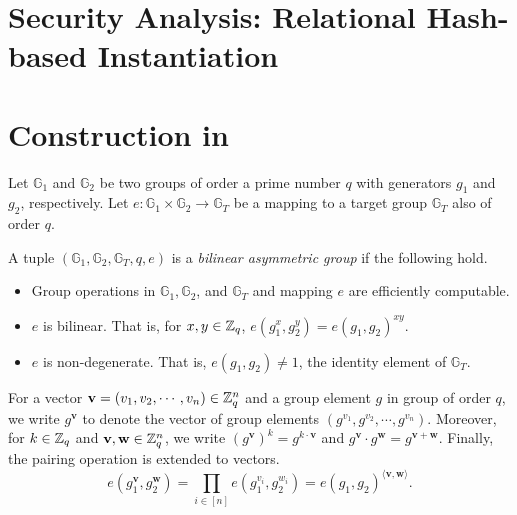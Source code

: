 \section{Security Analysis: Relational Hash-based Instantiation}
\label{sec:security_analysis:rh}



\newpage
\appendix


\section{Construction in \cite{cryptoeprint:2016/440}}
\label{sec:fh-IPFE-construction}

Let $\mathbb{G}_1$ and $\mathbb{G}_2$ be two groups of order a prime number $q$ with generators $g_1$ and $g_2$, respectively. Let $e: \mathbb{G}_1 \times \mathbb{G}_2 \to \mathbb{G}_T$ be a mapping to a target group $\mathbb{G}_T$ also of order $q$. 

\begin{definition}
\label{bilinear-group}

A tuple $(\mathbb{G}_1, \mathbb{G}_2, \mathbb{G}_T, q, e)$ is a \emph{bilinear asymmetric group} if the following hold.

\begin{itemize}

	\item Group operations in $\mathbb{G}_1, \mathbb{G}_2$, and $\mathbb{G}_T$ and mapping $e$ are efficiently computable.

	\item $e$ is bilinear. That is, for $x, y \in \mathbb{Z}_q$, $e(g_1^x, g_2^y) = e(g_1, g_2)^{xy}$.

	\item $e$ is non-degenerate. That is, $e(g_1, g_2) \neq 1$, the identity element of $\mathbb{G}_T$.

\end{itemize}

\end{definition}

For a vector $\mathbf{v} = (v_1, v_2, \cdots, v_n) \in \mathbb{Z}_q^n$ and a group element $g$ in group of order $q$, we write $g^\mathbf{v}$ to denote the vector of group elements $(g^{v_1}, g^{v_2}, \cdots, g^{v_n})$. Moreover, for $k \in \mathbb{Z}_q$ and $\mathbf{v}, \mathbf{w} \in \mathbb{Z}_q^n$, we write $(g^{\mathbf{v}})^k = g^{k \cdot \mathbf{v}}$ and $g^\mathbf{v} \cdot g^\mathbf{w} =  g^{\mathbf{v} + \mathbf{w}}$. Finally, the pairing operation is extended to vectors.
\[
	e(g_1^{\mathbf{v}}, g_2^{\mathbf{w}}) = \prod_{i \in [n]} e(g_1^{v_i}, g_2^{w_i}) = e(g_1, g_2)^{\langle \mathbf{v}, \mathbf{w} \rangle}.
\]

